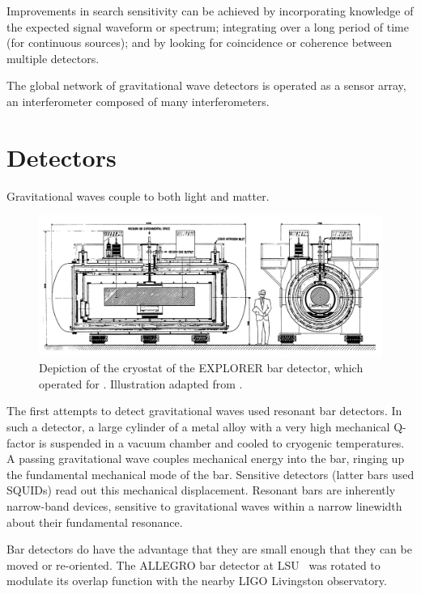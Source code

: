 Improvements in search sensitivity can be achieved by incorporating
knowledge of the expected signal waveform or spectrum; integrating
over a long period of time (for continuous sources); and by looking
for coincidence or coherence between multiple detectors.

The global network of gravitational wave detectors is operated as a
sensor array, an interferometer composed of many interferometers.

\section{Detectors}
Gravitational waves couple to both light and matter.

\begin{figure}
\includegraphics[width=\columnwidth]{chapter1/figures/explorer.png}
\caption[EXPLORER bar detector]{\label{fig:explorer-bar}Depiction of the cryostat of the
  EXPLORER bar detector, which operated  for
  .  Illustration adapted from .}
\end{figure}

The first attempts to detect gravitational waves used resonant bar
detectors.  In such a detector, a large cylinder of a metal alloy with
a very high mechanical Q-factor is suspended in a vacuum chamber and
cooled to cryogenic temperatures.  A passing gravitational wave
couples mechanical energy into the bar, ringing up the fundamental
mechanical mode of the bar.  Sensitive detectors (latter bars used
SQUIDs) read out this mechanical displacement.  Resonant bars are
inherently narrow-band devices, sensitive to gravitational waves
within a narrow linewidth about their fundamental resonance.

Bar detectors do have the advantage that they are small enough that
they can be moved or re-oriented.  The ALLEGRO bar detector at LSU~\cite{Mauceli1996Allegro} was
rotated to modulate its overlap function with the nearby LIGO
Livingston observatory.%

